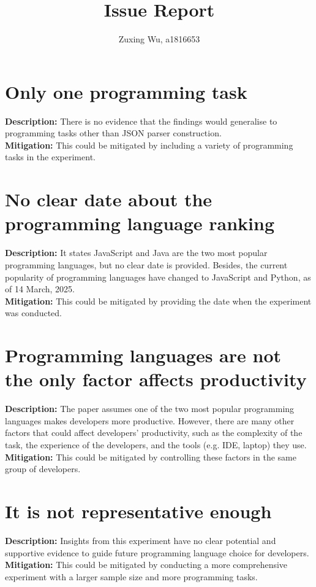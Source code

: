 \documentclass{article}
\title{Issue Report}
\author{Zuxing Wu, a1816653}
\date{}
\begin{document}
\maketitle

\section{Only one programming task}
\textbf{Description:} There is no evidence that the findings would generalise to programming tasks other than JSON parser construction.\\
\textbf{Mitigation:} This could be mitigated by including a variety of programming tasks in the experiment.

\section{No clear date about the programming language ranking}
\textbf{Description:} It states JavaScript and Java are the two most popular programming languages, but no clear date is provided. Besides, the current popularity of programming languages have changed to JavaScript and Python, as of 14 March, 2025.\\
\textbf{Mitigation:} This could be mitigated by providing the date when the experiment was conducted.

\section{Programming languages are not the only factor affects productivity}
\textbf{Description:} The paper assumes one of the two most popular programming languages makes developers more productive. However, there are many other factors that could affect developers' productivity, such as the complexity of the task, the experience of the developers, and the tools (e.g. IDE, laptop) they use.\\
\textbf{Mitigation:} This could be mitigated by controlling these factors in the same group of developers.

\section{It is not representative enough}
\textbf{Description:} Insights from this experiment have no clear potential and supportive evidence to guide future programming language choice for developers.\\
\textbf{Mitigation:} This could be mitigated by conducting a more comprehensive experiment with a larger sample size and more programming tasks.
\end{document}
